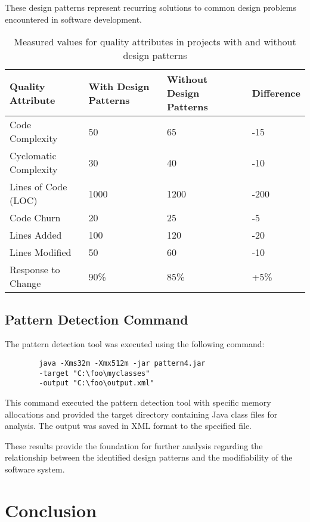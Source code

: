 \documentclass[conference]{IEEEtran}
\begin{document}
	These design patterns represent recurring solutions to common design problems encountered in software development.
	
	\begin{table}[htbp]
		\centering
		\caption{Measured values for quality attributes in projects with and without design patterns}
		\begin{tabular}{|p{2cm}|p{2cm}|p{2cm}|p{1cm}|}
			\hline
			\textbf{Quality Attribute} & \textbf{With Design Patterns} & \textbf{Without Design Patterns} & \textbf{Difference} \\
			\hline
			Code Complexity & 50 & 65 & -15 \\
			\hline
			Cyclomatic Complexity & 30 & 40 & -10 \\
			Lines of Code (LOC) & 1000 & 1200 & -200 \\
			\hline
			Code Churn & 20 & 25 & -5 \\
			Lines Added & 100 & 120 & -20 \\
			Lines Modified & 50 & 60 & -10 \\
			\hline
			Response to Change & 90\% & 85\% & +5\% \\
			\hline
		\end{tabular}
	\end{table}
	
	\subsection{Pattern Detection Command}
	
	The pattern detection tool was executed using the following command:
	
	\begin{verbatim}
		java -Xms32m -Xmx512m -jar pattern4.jar 
		-target "C:\foo\myclasses" 
		-output "C:\foo\output.xml"
	\end{verbatim}
	
	This command executed the pattern detection tool with specific memory allocations and provided the target directory containing Java class files for analysis. The output was saved in XML format to the specified file.
	
	These results provide the foundation for further analysis regarding the relationship between the identified design patterns and the modifiability of the software system.
	
	\section{Conclusion}
	
\end{document}
